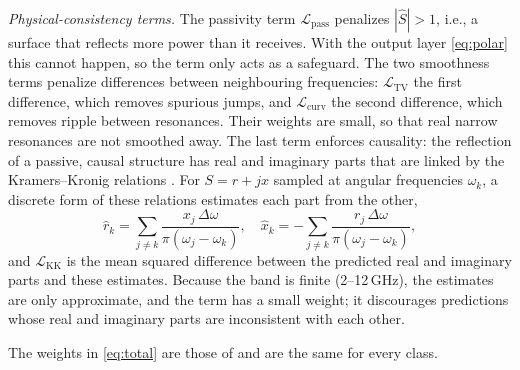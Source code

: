 \documentclass[journal]{IEEEtran}
\newcommand{\Sc}{\hat{S}}
\newcommand{\Lloss}[1]{\mathcal{L}_{\mathrm{#1}}}
\begin{document}
\emph{Physical-consistency terms.} The passivity term $\Lloss{pass}$ penalizes $|\Sc|>1$, i.e., a surface that reflects more power than it receives. With the output layer \eqref{eq:polar} this cannot happen, so the term only acts as a safeguard. The two smoothness terms penalize differences between neighbouring frequencies: $\Lloss{TV}$ the first difference, which removes spurious jumps, and $\Lloss{curv}$ the second difference, which removes ripple between resonances. Their weights are small, so that real narrow resonances are not smoothed away. The last term enforces causality: the reflection of a passive, causal structure has real and imaginary parts that are linked by the Kramers--Kronig relations \cite{lucarini}. For $S=r+jx$ sampled at angular frequencies $\omega_k$, a discrete form of these relations estimates each part from the other,
\begin{equation}
\hat{r}_k=\sum_{j\neq k}\frac{x_j\,\Delta\omega}{\pi(\omega_j-\omega_k)},
\quad
\hat{x}_k=-\sum_{j\neq k}\frac{r_j\,\Delta\omega}{\pi(\omega_j-\omega_k)},
\label{eq:kkdisc}
\end{equation}
and $\Lloss{KK}$ is the mean squared difference between the predicted real and imaginary parts and these estimates. Because the band is finite (2--12\,GHz), the estimates are only approximate, and the term has a small weight; it discourages predictions whose real and imaginary parts are inconsistent with each other.

The weights in \eqref{eq:total} are those of \cite{edgeaware} and are the same for every class.
\end{document}

